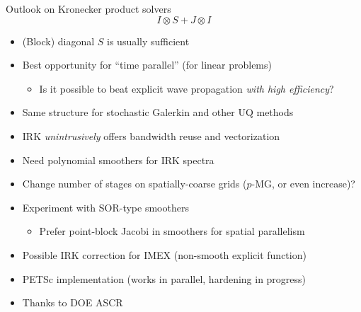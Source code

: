 \documentclass{beamer}
\begin{document}
\begin{frame}{Outlook on Kronecker product solvers}
  $$ I \otimes S + J \otimes I $$
  \begin{itemize}
  \item (Block) diagonal $S$ is usually sufficient
  \item Best opportunity for ``time parallel'' (for linear problems)
    \begin{itemize}
    \item Is it possible to beat explicit wave propagation \emph{with high efficiency}?
    \end{itemize}
  \item Same structure for stochastic Galerkin and other UQ methods
  \item IRK \emph{unintrusively} offers bandwidth reuse and vectorization
  \item Need polynomial smoothers for IRK spectra
  \item Change number of stages on spatially-coarse grids ($p$-MG, or even increase)?
  \item Experiment with SOR-type smoothers
    \begin{itemize}
    \item Prefer point-block Jacobi in smoothers for spatial parallelism
    \end{itemize}
  \item Possible IRK correction for IMEX (non-smooth explicit function)
  \item PETSc implementation (works in parallel, hardening in progress)
  \item Thanks to DOE ASCR
  \end{itemize}
\end{frame}
\end{document}
